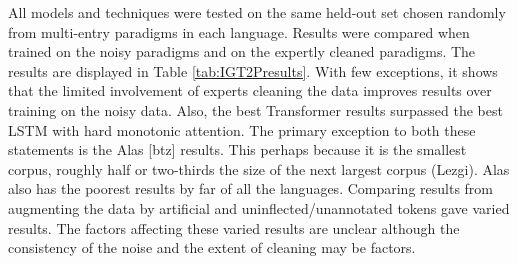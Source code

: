 All models and techniques were tested on the same held-out set chosen randomly from multi-entry paradigms in each language. Results were compared when trained on the noisy paradigms and on the expertly cleaned paradigms. The results are displayed in Table \ref{tab:IGT2Presults}. With few exceptions, it shows that the limited involvement of experts cleaning the data improves results over training on the noisy data. Also, the best Transformer results surpassed the best LSTM with hard monotonic attention. The primary exception to both these statements is the Alas [btz] results. This perhaps because it is the smallest corpus, roughly half or two-thirds the size of the next largest corpus (Lezgi). Alas also has the poorest results by far of all the languages.
Comparing results from augmenting the data by artificial and uninflected/unannotated tokens gave varied results. The factors affecting these varied results are unclear although the consistency of the noise and the extent of cleaning may be factors. 


